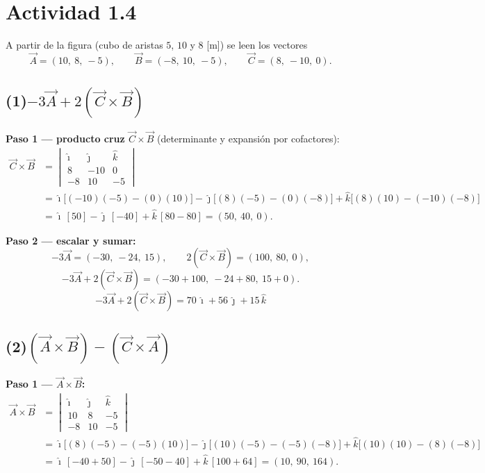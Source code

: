 \documentclass[12pt,letterpaper]{article}
\newcommand{\ii}{\hat{\imath}}
\newcommand{\jj}{\hat{\jmath}}
\newcommand{\kk}{\hat{k}}
\begin{document}
\newpage

\section*{Actividad 1.4}

\noindent A partir de la figura (cubo de aristas $5$, $10$ y $8$ [m]) se leen los vectores
\[
    \vec{A} = (10,\ 8,\ -5),\qquad
    \vec{B} = (-8,\ 10,\ -5),\qquad
    \vec{C} = (8,\ -10,\ 0).
\]

\subsection*{(1)\quad $-3\vec{A} + 2(\vec{C}\times\vec{B})$}

\noindent\textbf{Paso 1 — producto cruz $\vec{C}\times\vec{B}$} (determinante y expansi\'on por cofactores):
\begin{align*}
    \vec{C}\times\vec{B}
    &= \begin{vmatrix} \ii & \jj & \kk \\ 8 & -10 & 0 \\ -8 & 10 & -5 \end{vmatrix}\\[2pt]
    &= \ii\big[(-10)(-5)-(0)(10)\big] - \jj\big[(8)(-5)-(0)(-8)\big] + \kk\big[(8)(10)-(-10)(-8)\big]\\
    &= \ii\,[50] - \jj\,[-40] + \kk\,[80-80]
     = (50,\ 40,\ 0).
\end{align*}

\noindent\textbf{Paso 2 — escalar y sumar:}
\[
    -3\vec{A} = (-30,\ -24,\ 15),\qquad 2(\vec{C}\times\vec{B}) = (100,\ 80,\ 0),
\]
\[
    -3\vec{A} + 2(\vec{C}\times\vec{B}) = (-30+100,\ -24+80,\ 15+0).
\]
\[
    \boxed{-3\vec{A} + 2(\vec{C}\times\vec{B}) = 70\,\ii + 56\,\jj + 15\,\kk}
\]

\subsection*{(2)\quad $(\vec{A}\times\vec{B}) - (\vec{C}\times\vec{A})$}

\noindent\textbf{Paso 1 — $\vec{A}\times\vec{B}$:}
\begin{align*}
    \vec{A}\times\vec{B}
    &= \begin{vmatrix} \ii & \jj & \kk \\ 10 & 8 & -5 \\ -8 & 10 & -5 \end{vmatrix}\\[2pt]
    &= \ii\big[(8)(-5)-(-5)(10)\big] - \jj\big[(10)(-5)-(-5)(-8)\big] + \kk\big[(10)(10)-(8)(-8)\big]\\
    &= \ii\,[-40+50] - \jj\,[-50-40] + \kk\,[100+64]
     = (10,\ 90,\ 164).
\end{align*}
\end{document}

